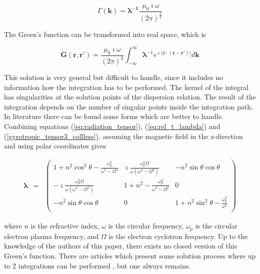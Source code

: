 \documentclass[a4paper,11pt]{article}
\begin{document}
\begin{equation}
    \Gamma(\mathbf{k}) =\mathbf{\lambda^{-1} }\frac{\mu_0 \imath \omega }{(2\pi )^{\frac{3}{2}}}
\end{equation}


The Green's function can be transformed into real space, which is

\begin{equation}\label{eq:general_greens_function}
    \mathbf{G}(\mathbf{r},\mathbf{r'})= \frac{\mu_0 \imath \omega }{(2\pi )^3}\int_{-\infty}^{\infty} \mathbf{\lambda}^{-1} e^{\imath \mathbf(k \cdot (\mathbf{r}-\mathbf{r}'))}d\mathbf{k}
\end{equation}

This solution is very general but difficult to handle, since it includes no information how the integration has to be performed. The kernel of the integral has singularities at the solution points of the dispersion relation. The result of the integration depends on the number of singular points inside the integration path.\\

In literature there can be found some forms which are better to handle. Combining equations (\ref{eq:radiation_tensor}), (\ref{eq:rel_t_lambda}) and (\ref{gyrotropic_tensor3_collless}), assuming the magnetic field in the z-direction and using polar coordinates gives


\begin{eqnarray}
    \mathbf{\lambda}&=&
\left(%
\begin{array}{ccc}
   1+n^2 \cos^2 \theta -\frac{\omega_p^2}{\omega^2 -\Omega^2} &  \imath \frac{\omega_p^2 \Omega}{\omega(\omega^2-\Omega^2)} & -n^2 \sin \theta \cos \theta \\
-\imath \frac{\omega_p^2 \Omega}{\omega(\omega^2-\Omega^2)}&  1+n^2-\frac{\omega_p^2}{\omega^2 -\Omega^2} & 0\\
 -n^2 \sin \theta \cos \theta  & 0 &   1+n^2 \sin^2 \theta -\frac{\omega_p^2}{\omega^2} \\
\end{array}%
\right) \nonumber
\end{eqnarray}

where $n$ is the refractive index, $\omega$ is the circular frequency, $\omega_p$ is the circular electron plasma frequency, and $\Omega$ is the electron cyclotron frequency. Up to the knowledge of the authors of this paper, there exists no closed version of this Green's function. There are articles which present some solution process where up to 2 integrations can be performed \cite{weiglhofer}, but one always remains.\\
\end{document}
